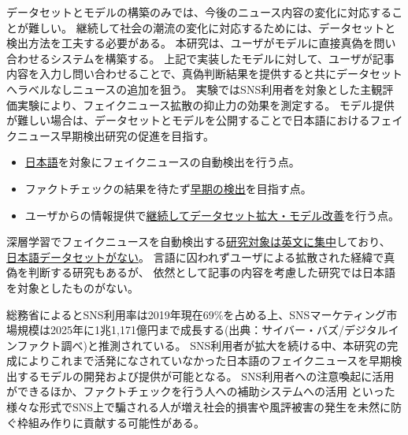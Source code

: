 データセットとモデルの構築のみでは、今後のニュース内容の変化に対応することが難しい。
継続して社会の潮流の変化に対応するためには、データセットと検出方法を工夫する必要がある。
本研究は、ユーザがモデルに直接真偽を問い合わせるシステムを構築する。
上記で実装したモデルに対して、ユーザが記事内容を入力し問い合わせることで、真偽判断結果を提供すると共にデータセットへラベルなしニュースの追加を狙う。
実験ではSNS利用者を対象とした主観評価実験により、フェイクニュース拡散の抑止力の効果を測定する。
モデル提供が難しい場合は、データセットとモデルを公開することで日本語におけるフェイクニュース早期検出研究の促進を目指す。


\vspace{20pt}
\begin{itemize}
    \setlength{\parskip}{0cm}
    \setlength{\itemsep}{0cm}
    \item \underline{日本語}を対象にフェイクニュースの自動検出を行う点。
    \item ファクトチェックの結果を待たず\underline{早期の検出}を目指す点。
    \item ユーザからの情報提供で\underline{継続してデータセット拡大・モデル改善}を行う点。
\end{itemize}

深層学習でフェイクニュースを自動検出する\underline{研究対象は英文に集中}しており、
\underline{日本語データセットがない}。
言語に囚われずユーザによる拡散された経緯で真偽を判断する研究もあるが\cite{tarek2020}、
依然として記事の内容を考慮した研究では日本語を対象としたものがない。

総務省によるとSNS利用率は2019年現在69\%を占める上、SNSマーケティング市場規模は2025年に1兆1,171億円まで成長する(出典：サイバー・バズ/デジタルインファクト調べ)と推測されている。
SNS利用者が拡大を続ける中、本研究の完成によりこれまで活発になされていなかった日本語のフェイクニュースを早期検出するモデルの開発および提供が可能となる。
SNS利用者への注意喚起に活用ができるほか、ファクトチェックを行う人への補助システムへの活用
といった様々な形式でSNS上で騙される人が増え社会的損害や風評被害の発生を未然に防ぐ枠組み作りに貢献する可能性がある。

